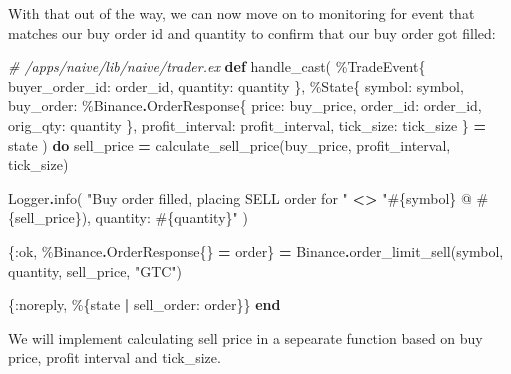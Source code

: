 \documentclass[
  oneside]{book}
\newenvironment{Shaded}{\begin{snugshade}}{\end{snugshade}}
\newcommand{\CommentTok}[1]{\textcolor[rgb]{0.56,0.35,0.01}{\textit{#1}}}
\newcommand{\ConstantTok}[1]{\textcolor[rgb]{0.00,0.00,0.00}{#1}}
\newcommand{\KeywordTok}[1]{\textcolor[rgb]{0.13,0.29,0.53}{\textbf{#1}}}
\newcommand{\NormalTok}[1]{#1}
\newcommand{\OperatorTok}[1]{\textcolor[rgb]{0.81,0.36,0.00}{\textbf{#1}}}
\newcommand{\OtherTok}[1]{\textcolor[rgb]{0.56,0.35,0.01}{#1}}
\newcommand{\StringTok}[1]{\textcolor[rgb]{0.31,0.60,0.02}{#1}}
\newcommand{\VariableTok}[1]{\textcolor[rgb]{0.00,0.00,0.00}{#1}}
\begin{document}
With that out of the way, we can now move on to monitoring for event that matches our buy order id and quantity to confirm that our buy order got filled:

\begin{Shaded}
\begin{Highlighting}[]
  \CommentTok{\# /apps/naive/lib/naive/trader.ex}
  \KeywordTok{def}\NormalTok{ handle\_cast(}
\NormalTok{        \%}\ConstantTok{TradeEvent}\NormalTok{\{}
          \VariableTok{buyer\_order\_id:}\NormalTok{ order\_id,}
          \VariableTok{quantity:}\NormalTok{ quantity}
\NormalTok{        \},}
\NormalTok{        \%}\ConstantTok{State}\NormalTok{\{}
          \VariableTok{symbol:}\NormalTok{ symbol,}
          \VariableTok{buy\_order:}\NormalTok{ \%}\ConstantTok{Binance}\OperatorTok{.}\ConstantTok{OrderResponse}\NormalTok{\{}
            \VariableTok{price:}\NormalTok{ buy\_price,}
            \VariableTok{order\_id:}\NormalTok{ order\_id,}
            \VariableTok{orig\_qty:}\NormalTok{ quantity}
\NormalTok{          \},}
          \VariableTok{profit\_interval:}\NormalTok{ profit\_interval,}
          \VariableTok{tick\_size:}\NormalTok{ tick\_size}
\NormalTok{        \} }\OperatorTok{=}\NormalTok{ state}
\NormalTok{      ) }\KeywordTok{do}
\NormalTok{    sell\_price }\OperatorTok{=}\NormalTok{ calculate\_sell\_price(buy\_price, profit\_interval, tick\_size)}

    \ConstantTok{Logger}\OperatorTok{.}\NormalTok{info(}
      \StringTok{"Buy order filled, placing SELL order for "} \OperatorTok{\textless{}\textgreater{}}
        \StringTok{"}\OtherTok{\#\{}\NormalTok{symbol}\OtherTok{\}}\StringTok{ @ }\OtherTok{\#\{}\NormalTok{sell\_price}\OtherTok{\}}\StringTok{), quantity: }\OtherTok{\#\{}\NormalTok{quantity}\OtherTok{\}}\StringTok{"}
\NormalTok{    )}

\NormalTok{    \{}\VariableTok{:ok}\NormalTok{, \%}\ConstantTok{Binance}\OperatorTok{.}\ConstantTok{OrderResponse}\NormalTok{\{\} }\OperatorTok{=}\NormalTok{ order\} }\OperatorTok{=}
      \ConstantTok{Binance}\OperatorTok{.}\NormalTok{order\_limit\_sell(symbol, quantity, sell\_price, }\StringTok{"GTC"}\NormalTok{)}

\NormalTok{    \{}\VariableTok{:noreply}\NormalTok{, \%\{state }\OperatorTok{|} \VariableTok{sell\_order:}\NormalTok{ order\}\}}
  \KeywordTok{end}
\end{Highlighting}
\end{Shaded}

We will implement calculating sell price in a sepearate function based on buy price, profit interval and tick\_size.
\end{document}
